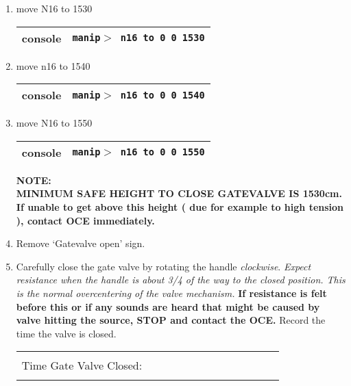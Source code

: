 \begin{enumerate}

\item \checkbox move N16 to 1530
  \begin{center}
  \begin{tabular}{|l|l|}
  \hline
  console & {\tt manip$>$ n16 to 0 0 1530} \\
  \hline
  \end{tabular}
  \end{center}  
\item \checkbox move n16 to 1540
  \begin{center}
  \begin{tabular}{|l|l|}
  \hline
  console & {\tt manip$>$ n16 to 0 0 1540} \\
  \hline
  \end{tabular}
  \end{center}  
\item \checkbox move N16 to 1550
  \begin{center}
  \begin{tabular}{|l|l|}
  \hline
  console & {\tt manip$>$ n16 to 0 0 1550} \\
  \hline
  \end{tabular}
  \end{center}
{\bf
 NOTE:\\
   MINIMUM SAFE HEIGHT TO CLOSE GATEVALVE IS 1530cm.\\
   If unable to get above this height ( due for example to high tension ), contact OCE
immediately.
}


\item Remove `Gatevalve open' sign.

\item \checkbox Carefully close the gate valve by rotating the handle {\em clockwise}.
  {\em Expect resistance when the handle is about 3/4 of the way to
  the closed position.  This is the normal overcentering of the
  valve mechanism.} {\bf If resistance is felt before this or 
  if any sounds are heard that might be caused by valve hitting the source,
  STOP and contact the OCE.}
  Record the time the valve is closed.
     \begin{center}
     \begin{tabular}{|l|}
     \hline
      \\
     Time Gate Valve Closed:~~~~~~~~~~~~~~~~~~~~~~~~\\
      \\
     \hline
     \end{tabular}
     \end{center}



\end{enumerate}
